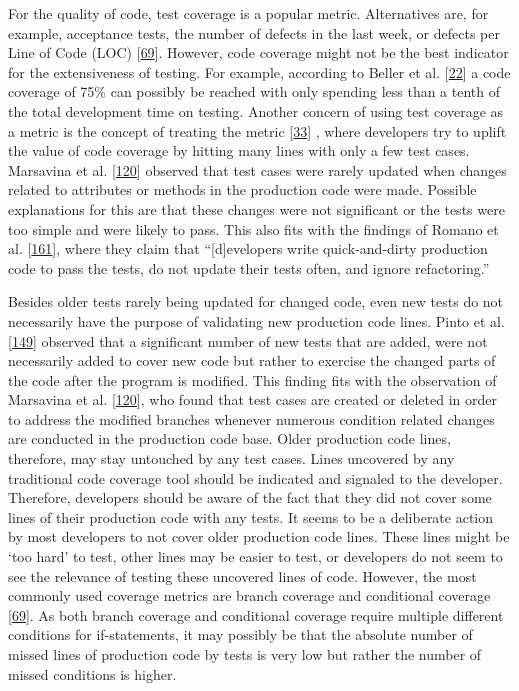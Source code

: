 \documentclass[]{book}
\begin{document}
For the quality of code, test coverage is a popular metric. Alternatives
are, for example, acceptance tests, the number of defects in the last
week, or defects per Line of Code (LOC)
{[}\protect\hyperlink{ref-GAROUSI20131354}{69}{]}. However, code
coverage might not be the best indicator for the extensiveness of
testing. For example, according to Beller et al.
{[}\protect\hyperlink{ref-Beller:2015:DT:2819009.2819101}{22}{]} a code
coverage of 75\% can possibly be reached with only spending less than a
tenth of the total development time on testing. Another concern of using
test coverage as a metric is the concept of treating the metric
{[}\protect\hyperlink{ref-bouwers2012a}{33}{]} , where developers try to
uplift the value of code coverage by hitting many lines with only a few
test cases. Marsavina et al.
{[}\protect\hyperlink{ref-marsavina2014}{120}{]} observed that test
cases were rarely updated when changes related to attributes or methods
in the production code were made. Possible explanations for this are
that these changes were not significant or the tests were too simple and
were likely to pass. This also fits with the findings of Romano et al.
{[}\protect\hyperlink{ref-ROMANO201764}{161}{]}, where they claim that
``{[}d{]}evelopers write quick-and-dirty production code to pass the
tests, do not update their tests often, and ignore refactoring.''

Besides older tests rarely being updated for changed code, even new
tests do not necessarily have the purpose of validating new production
code lines. Pinto et al.
{[}\protect\hyperlink{ref-pinto2012understanding}{149}{]} observed that
a significant number of new tests that are added, were not necessarily
added to cover new code but rather to exercise the changed parts of the
code after the program is modified. This finding fits with the
observation of Marsavina et al.
{[}\protect\hyperlink{ref-marsavina2014}{120}{]}, who found that test
cases are created or deleted in order to address the modified branches
whenever numerous condition related changes are conducted in the
production code base. Older production code lines, therefore, may stay
untouched by any test cases. Lines uncovered by any traditional code
coverage tool should be indicated and signaled to the developer.
Therefore, developers should be aware of the fact that they did not
cover some lines of their production code with any tests. It seems to be
a deliberate action by most developers to not cover older production
code lines. These lines might be `too hard' to test, other lines may be
easier to test, or developers do not seem to see the relevance of
testing these uncovered lines of code. However, the most commonly used
coverage metrics are branch coverage and conditional coverage
{[}\protect\hyperlink{ref-GAROUSI20131354}{69}{]}. As both branch
coverage and conditional coverage require multiple different conditions
for if-statements, it may possibly be that the absolute number of missed
lines of production code by tests is very low but rather the number of
missed conditions is higher.
\end{document}
